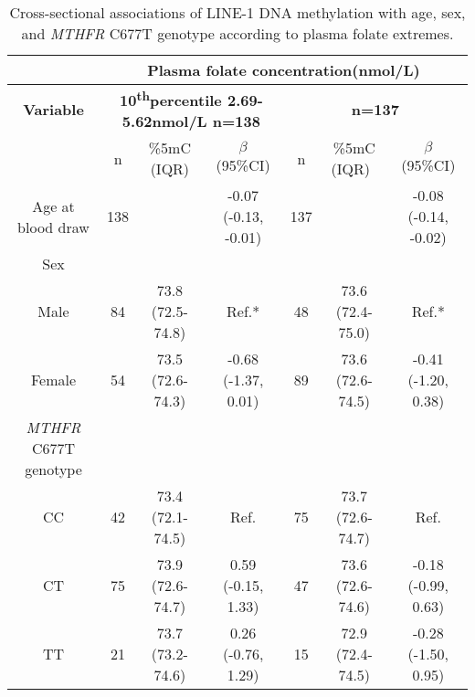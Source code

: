 \begin{flushleft}
\begin{table}
\caption{Cross-sectional associations of LINE-1 DNA methylation with age, sex, and \emph{MTHFR} C677T genotype according to plasma folate extremes.}\label{table3_2}\tablehead{}
\begin{adjustbox}{width=\textwidth}
\begin{tabular}{ccccccc}
\hline 
~ &\multicolumn{6}{c}{\centering Plasma folate concentration(nmol/L)}\\
\hline 
\bfseries Variable 
&\multicolumn{3}{c}{\parbox[t]{3cm}{\centering \textbf{ 10\textsuperscript{th}percentile 2.69-5.62nmol/L  n=138}}} 
&\multicolumn{3}{c}{\centering {{\textbf{90}}\textsf{\textbf{\textsuperscript{th}}}\textsf{\textbf{percentile}}}\par\centering {\bfseries 37.24-95.94nmol/L}\par\centering \bfseries n=137}\\
\hline 
~ & n & \%5mC (IQR) & $\beta $ (95\%CI) & n &{ \%5mC (IQR)}~ & $\beta $ (95\%CI)\\
\hline 
 Age at blood draw & 138 &~ & {}-0.07 (-0.13, -0.01) & 137 &~ & {}-0.08 (-0.14, -0.02)\\
 \hline 
 Sex &~ &~ &~ &~ &~ &~\\ Male & 84 & 73.8 (72.5-74.8) & Ref.* & 48 & 73.6 (72.4-75.0) & Ref.*\\ Female & 54 & 73.5 (72.6-74.3) & {}-0.68 (-1.37, 0.01) & 89 & 73.6 (72.6-74.5) & {}-0.41 (-1.20, 0.38)\\
 \hline 
 {\textit{MTHFR}}{ C677T genotype}&~ &~ &~ &~ &~ &~\\ CC & 42 & 73.4 (72.1-74.5) & Ref. & 75 & 73.7 (72.6-74.7) & Ref.\\ CT & 75 & 73.9 (72.6-74.7) & 0.59 (-0.15, 1.33) & 47 & 73.6 (72.6-74.6) & {}-0.18 (-0.99, 0.63)\\ TT & 21 & 73.7 (73.2-74.6) & 0.26 (-0.76, 1.29) & 15 & 72.9 (72.4-74.5) & {}-0.28 (-1.50, 0.95)\\
 \hline 
\end{tabular}
\end{adjustbox}
\end{table}
\end{flushleft}



